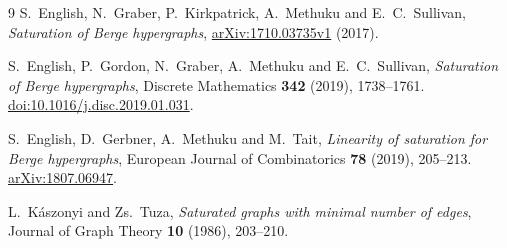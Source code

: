 \documentclass[11pt]{article}
\theoremstyle{definition}
\theoremstyle{remark}
\begin{document}
\begin{thebibliography}{9}
S.~English, N.~Graber, P.~Kirkpatrick, A.~Methuku and E.~C.~Sullivan,
\emph{Saturation of Berge hypergraphs},
\href{https://arxiv.org/abs/1710.03735v1}{arXiv:1710.03735v1} (2017).

S.~English, P.~Gordon, N.~Graber, A.~Methuku and E.~C.~Sullivan,
\emph{Saturation of Berge hypergraphs}, Discrete Mathematics
\textbf{342} (2019), 1738--1761.
\href{https://doi.org/10.1016/j.disc.2019.01.031}{doi:10.1016/j.disc.2019.01.031}.

S.~English, D.~Gerbner, A.~Methuku and M.~Tait,
\emph{Linearity of saturation for Berge hypergraphs}, European Journal of
Combinatorics \textbf{78} (2019), 205--213.
\href{https://arxiv.org/abs/1807.06947}{arXiv:1807.06947}.

L.~K\'aszonyi and Zs.~Tuza, \emph{Saturated graphs with minimal number of
edges}, Journal of Graph Theory \textbf{10} (1986), 203--210.
\end{thebibliography}
\end{document}
